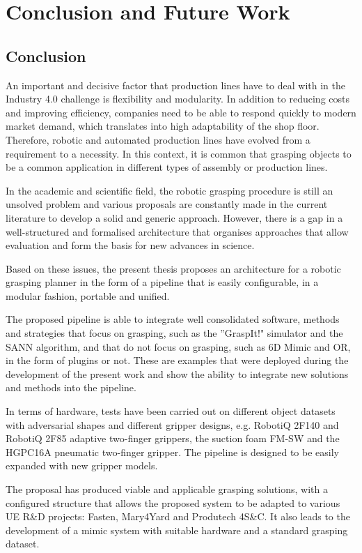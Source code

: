 \chapter{Conclusion and Future Work}
\label{cap6:conclusion}

\section{Conclusion}

An important and decisive factor that production lines have to deal with in the Industry 4.0 challenge is flexibility and modularity. In addition to reducing costs and improving efficiency, companies need to be able to respond quickly to modern market demand, which translates into high adaptability of the shop floor. Therefore, robotic and automated production lines have evolved from a requirement to a necessity. In this context, it is common that grasping objects to be a common application in different types of assembly or production lines. 

In the academic and scientific field, the robotic grasping procedure is still an unsolved problem and various proposals are constantly made in the current literature to develop a solid and generic approach. However, there is a gap in a well-structured and formalised architecture that organises approaches that allow evaluation and form the basis for new advances in science.

Based on these issues, the present thesis proposes an architecture for a robotic grasping planner in the form of a pipeline that is easily configurable, in a modular fashion, portable and unified.

The proposed pipeline is able to integrate well consolidated software, methods and strategies that focus on grasping, such as the ''GraspIt!" simulator and the \ac{SANN} algorithm, and that do not focus on grasping, such as 6D Mimic and OR, in the form of plugins or not. These are examples that were deployed during the development of the present work and show the ability to integrate new solutions and methods into the pipeline.

In terms of hardware, tests have been carried out on different object datasets with adversarial shapes and different gripper designs, e.g. RobotiQ 2F140 and RobotiQ 2F85 adaptive two-finger grippers, the suction foam FM-SW and the HGPC16A pneumatic two-finger gripper. The pipeline is designed to be easily expanded with new gripper models.

The proposal has produced viable and applicable grasping solutions, with a configured structure that allows the proposed system to be adapted to various UE R\&D projects: Fasten, Mary4Yard and Produtech 4S\&C. It also leads to the development of a mimic system with suitable hardware and a standard grasping dataset.

